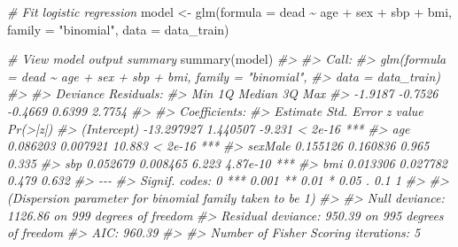 \documentclass[
]{article}
\newenvironment{Shaded}{\begin{snugshade}}{\end{snugshade}}
\newcommand{\AttributeTok}[1]{\textcolor[rgb]{0.77,0.63,0.00}{#1}}
\newcommand{\CommentTok}[1]{\textcolor[rgb]{0.56,0.35,0.01}{\textit{#1}}}
\newcommand{\FunctionTok}[1]{\textcolor[rgb]{0.00,0.00,0.00}{#1}}
\newcommand{\NormalTok}[1]{#1}
\newcommand{\OtherTok}[1]{\textcolor[rgb]{0.56,0.35,0.01}{#1}}
\newcommand{\SpecialCharTok}[1]{\textcolor[rgb]{0.00,0.00,0.00}{#1}}
\newcommand{\StringTok}[1]{\textcolor[rgb]{0.31,0.60,0.02}{#1}}
\begin{document}
\begin{Shaded}
\begin{Highlighting}[]
\CommentTok{\# Fit logistic regression}
\NormalTok{model }\OtherTok{\textless{}{-}} \FunctionTok{glm}\NormalTok{(}\AttributeTok{formula =}\NormalTok{ dead }\SpecialCharTok{\textasciitilde{}}\NormalTok{ age }\SpecialCharTok{+}\NormalTok{ sex }\SpecialCharTok{+}\NormalTok{ sbp }\SpecialCharTok{+}\NormalTok{ bmi,}
             \AttributeTok{family =} \StringTok{"binomial"}\NormalTok{,}
             \AttributeTok{data =}\NormalTok{ data\_train)}

\CommentTok{\# View model output summary}
\FunctionTok{summary}\NormalTok{(model)}
\CommentTok{\#\textgreater{} }
\CommentTok{\#\textgreater{} Call:}
\CommentTok{\#\textgreater{} glm(formula = dead \textasciitilde{} age + sex + sbp + bmi, family = "binomial", }
\CommentTok{\#\textgreater{}     data = data\_train)}
\CommentTok{\#\textgreater{} }
\CommentTok{\#\textgreater{} Deviance Residuals: }
\CommentTok{\#\textgreater{}     Min       1Q   Median       3Q      Max  }
\CommentTok{\#\textgreater{} {-}1.9187  {-}0.7526  {-}0.4669   0.6399   2.7754  }
\CommentTok{\#\textgreater{} }
\CommentTok{\#\textgreater{} Coefficients:}
\CommentTok{\#\textgreater{}               Estimate Std. Error z value Pr(\textgreater{}|z|)    }
\CommentTok{\#\textgreater{} (Intercept) {-}13.297927   1.440507  {-}9.231  \textless{} 2e{-}16 ***}
\CommentTok{\#\textgreater{} age           0.086203   0.007921  10.883  \textless{} 2e{-}16 ***}
\CommentTok{\#\textgreater{} sexMale       0.155126   0.160836   0.965    0.335    }
\CommentTok{\#\textgreater{} sbp           0.052679   0.008465   6.223 4.87e{-}10 ***}
\CommentTok{\#\textgreater{} bmi           0.013306   0.027782   0.479    0.632    }
\CommentTok{\#\textgreater{} {-}{-}{-}}
\CommentTok{\#\textgreater{} Signif. codes:  0 \textquotesingle{}***\textquotesingle{} 0.001 \textquotesingle{}**\textquotesingle{} 0.01 \textquotesingle{}*\textquotesingle{} 0.05 \textquotesingle{}.\textquotesingle{} 0.1 \textquotesingle{} \textquotesingle{} 1}
\CommentTok{\#\textgreater{} }
\CommentTok{\#\textgreater{} (Dispersion parameter for binomial family taken to be 1)}
\CommentTok{\#\textgreater{} }
\CommentTok{\#\textgreater{}     Null deviance: 1126.86  on 999  degrees of freedom}
\CommentTok{\#\textgreater{} Residual deviance:  950.39  on 995  degrees of freedom}
\CommentTok{\#\textgreater{} AIC: 960.39}
\CommentTok{\#\textgreater{} }
\CommentTok{\#\textgreater{} Number of Fisher Scoring iterations: 5}


\end{Highlighting}
\end{Shaded}
\end{document}
